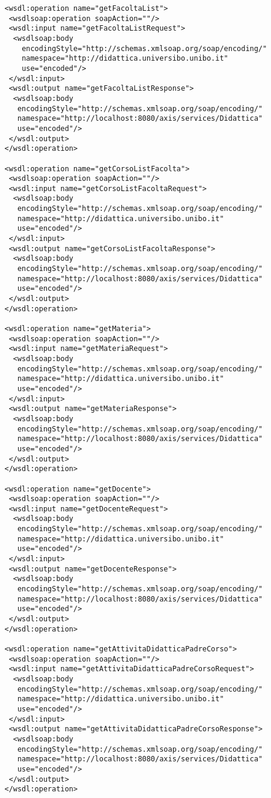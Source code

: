 \begin{small}
\begin{verbatim}
   <wsdl:operation name="getFacoltaList">
    <wsdlsoap:operation soapAction=""/>
    <wsdl:input name="getFacoltaListRequest">
     <wsdlsoap:body
       encodingStyle="http://schemas.xmlsoap.org/soap/encoding/"
       namespace="http://didattica.universibo.unibo.it" 
       use="encoded"/>
    </wsdl:input>
    <wsdl:output name="getFacoltaListResponse">
     <wsdlsoap:body 
      encodingStyle="http://schemas.xmlsoap.org/soap/encoding/"
      namespace="http://localhost:8080/axis/services/Didattica"
      use="encoded"/>
    </wsdl:output>
   </wsdl:operation>

   <wsdl:operation name="getCorsoListFacolta">
    <wsdlsoap:operation soapAction=""/>
    <wsdl:input name="getCorsoListFacoltaRequest">
     <wsdlsoap:body
      encodingStyle="http://schemas.xmlsoap.org/soap/encoding/"
      namespace="http://didattica.universibo.unibo.it" 
      use="encoded"/>
    </wsdl:input>
    <wsdl:output name="getCorsoListFacoltaResponse">
     <wsdlsoap:body 
      encodingStyle="http://schemas.xmlsoap.org/soap/encoding/"
      namespace="http://localhost:8080/axis/services/Didattica"
      use="encoded"/>
    </wsdl:output>
   </wsdl:operation>

   <wsdl:operation name="getMateria">
    <wsdlsoap:operation soapAction=""/>
    <wsdl:input name="getMateriaRequest">
     <wsdlsoap:body
      encodingStyle="http://schemas.xmlsoap.org/soap/encoding/"
      namespace="http://didattica.universibo.unibo.it" 
      use="encoded"/>
    </wsdl:input>
    <wsdl:output name="getMateriaResponse">
     <wsdlsoap:body 
      encodingStyle="http://schemas.xmlsoap.org/soap/encoding/"
      namespace="http://localhost:8080/axis/services/Didattica"
      use="encoded"/>
    </wsdl:output>
   </wsdl:operation>

   <wsdl:operation name="getDocente">
    <wsdlsoap:operation soapAction=""/>
    <wsdl:input name="getDocenteRequest">
     <wsdlsoap:body
      encodingStyle="http://schemas.xmlsoap.org/soap/encoding/"
      namespace="http://didattica.universibo.unibo.it" 
      use="encoded"/>
    </wsdl:input>
    <wsdl:output name="getDocenteResponse">
     <wsdlsoap:body 
      encodingStyle="http://schemas.xmlsoap.org/soap/encoding/"
      namespace="http://localhost:8080/axis/services/Didattica"
      use="encoded"/>
    </wsdl:output>
   </wsdl:operation>

   <wsdl:operation name="getAttivitaDidatticaPadreCorso">
    <wsdlsoap:operation soapAction=""/>
    <wsdl:input name="getAttivitaDidatticaPadreCorsoRequest">
     <wsdlsoap:body
      encodingStyle="http://schemas.xmlsoap.org/soap/encoding/"
      namespace="http://didattica.universibo.unibo.it" 
      use="encoded"/>
    </wsdl:input>
    <wsdl:output name="getAttivitaDidatticaPadreCorsoResponse">
     <wsdlsoap:body 
      encodingStyle="http://schemas.xmlsoap.org/soap/encoding/"
      namespace="http://localhost:8080/axis/services/Didattica"
      use="encoded"/>
    </wsdl:output>
   </wsdl:operation>



\end{verbatim}
\end{small}

